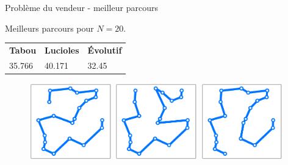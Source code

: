 \documentclass{beamer}
\begin{document}
\begin{frame}{Problème du vendeur - meilleur parcours}
\begin{center}
  Meilleurs parcours pour $N=20$.
\end{center}
\vspace{-0.5cm}
\begin{table}
  \centering
  \begin{tabular}{C{3cm}C{3cm}C{3cm}}
  \textbf{Tabou} & \textbf{Lucioles} & \textbf{Évolutif}\\
  35.766 & 40.171 & 32.45
  \end{tabular}
\end{table}
\vspace{-1cm}
\begin{figure}[h!]
  \centering
  \includegraphics[width=0.32\textwidth]{figures/salesman_tabu_n20.pdf}
    \includegraphics[width=0.32\textwidth]{figures/salesman_firefly_n20.pdf}
    \includegraphics[width=0.32\textwidth]{figures/salesman_genetic_n20.pdf}
\end{figure}
  


\end{frame}
\end{document}
